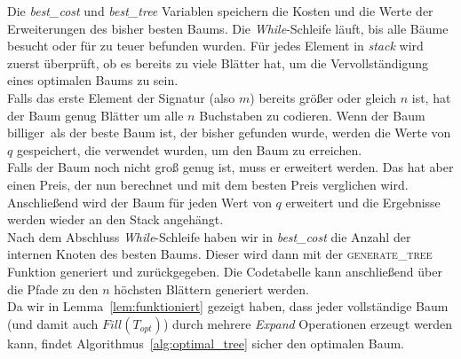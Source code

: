 \documentclass[a4paper,10pt,ngerman]{scrartcl}
\begin{document}
    Die \textit{best\_cost} und \textit{best\_tree} Variablen speichern die Kosten und die Werte der Erweiterungen des bisher besten Baums.
    Die \textit{While}-Schleife läuft, bis alle Bäume besucht oder für zu teuer befunden wurden.
    Für jedes Element in \textit{stack} wird zuerst überprüft, ob es bereits zu viele Blätter hat, um die Vervollständigung eines optimalen Baums zu sein.\\
    Falls das erste Element der Signatur (also $m$) bereits größer oder gleich $n$ ist, hat der Baum genug Blätter um alle $n$ Buchstaben zu codieren.
    Wenn der Baum \glqq billiger\grqq~als der beste Baum ist, der bisher gefunden wurde, werden die Werte von $q$ gespeichert, die verwendet wurden, um den Baum zu erreichen. \\
    Falls der Baum noch nicht groß genug ist, muss er erweitert werden.
    Das hat aber einen Preis, der nun berechnet und mit dem besten Preis verglichen wird. \\
    Anschließend wird der Baum für jeden Wert von $q$ erweitert und die Ergebnisse werden wieder an den Stack angehängt. \\
    Nach dem Abschluss \textit{While}-Schleife haben wir in \textit{best\_cost} die Anzahl der internen Knoten des besten Baums.
    Dieser wird dann mit der \textsc{generate\_tree} Funktion generiert und zurückgegeben.
    Die Codetabelle kann anschließend über die Pfade zu den $n$ höchsten Blättern generiert werden. \\
    Da wir in Lemma~\ref{lem:funktioniert} gezeigt haben, dass jeder vollständige Baum (und damit auch $Fill(T_{opt})$) durch mehrere \textit{Expand} Operationen erzeugt werden kann, findet Algorithmus~\ref{alg:optimal_tree} sicher den optimalen Baum.
\end{document}
